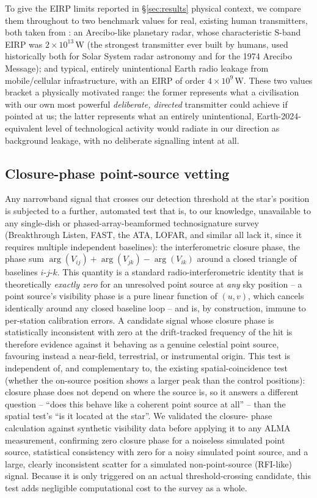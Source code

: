\documentclass{openjournal}
\begin{document}
To give the EIRP limits reported in \S\ref{sec:results} physical context,
we compare them throughout to two benchmark values for real, existing
human transmitters, both taken from \citet{EarthDetectingEarth2025}: an
Arecibo-like planetary radar, whose characteristic S-band EIRP was
$2\times10^{13}$\,W (the strongest transmitter ever built by humans,
used historically both for Solar System radar astronomy and for the 1974
Arecibo Message); and typical, entirely unintentional Earth radio
leakage from mobile/cellular infrastructure, with an EIRP of order
$4\times10^{9}$\,W. These two values bracket a physically motivated
range: the former represents what a civilisation with our own most
powerful \emph{deliberate, directed} transmitter could achieve if
pointed at us; the latter represents what an entirely unintentional,
Earth-2024-equivalent level of technological activity would radiate in
our direction as background leakage, with no deliberate signalling
intent at all.

\subsection{Closure-phase point-source vetting}
\label{sec:closurephase}

Any narrowband signal that crosses our detection threshold at the star's
position is subjected to a further, automated test that is, to our
knowledge, unavailable to any single-dish or phased-array-beamformed
technosignature survey (Breakthrough Listen, FAST, the ATA, LOFAR, and
similar all lack it, since it requires multiple independent baselines):
the interferometric closure phase, the phase sum
$\arg(V_{ij}) + \arg(V_{jk}) - \arg(V_{ik})$ around a closed triangle of
baselines $i$-$j$-$k$. This quantity is a standard radio-interferometric
identity that is theoretically \emph{exactly zero} for an unresolved
point source at \emph{any} sky position -- a point source's visibility
phase is a pure linear function of $(u,v)$, which cancels identically
around any closed baseline loop -- and is, by construction, immune to
per-station calibration errors. A candidate signal whose closure phase is
statistically inconsistent with zero at the drift-tracked frequency of
the hit is therefore evidence against it behaving as a genuine celestial
point source, favouring instead a near-field, terrestrial, or
instrumental origin. This test is independent of, and complementary to,
the existing spatial-coincidence test (whether the on-source position
shows a larger peak than the control positions): closure phase does not
depend on where the source is, so it answers a different question --
``does this behave like a coherent point source at all'' -- than the
spatial test's ``is it located at the star''. We validated the closure-
phase calculation against synthetic visibility data before applying it to
any ALMA measurement, confirming zero closure phase for a noiseless
simulated point source, statistical consistency with zero for a noisy
simulated point source, and a large, clearly inconsistent scatter for a
simulated non-point-source (RFI-like) signal. Because it is only
triggered on an actual threshold-crossing candidate, this test adds
negligible computational cost to the survey as a whole.
\end{document}
